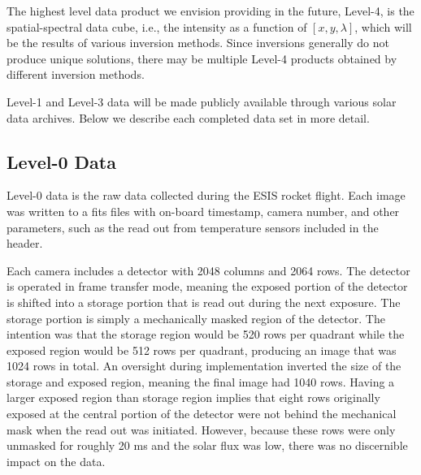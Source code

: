     The highest level data product we envision providing in the future, Level-4, is the spatial-spectral data cube, i.e., the intensity as a function of $[x, y , \lambda]$, which will be the results of various inversion methods.    
    Since inversions generally do not produce unique solutions, there may be multiple Level-4 products obtained by different inversion methods.  
    
    Level-1 and Level-3 data will be made publicly available through various solar data archives. Below we describe each completed data set in more detail. 
    
    \subsection{Level-0 Data}
    
        Level-0 data is the raw data collected during the ESIS rocket flight.  
	    Each image was written to a fits files with on-board timestamp, camera number, and other parameters, such as the read out from temperature sensors included in the header.   
	    
	    Each camera includes a detector with 2048 columns and 2064 rows.  The detector is operated in frame transfer mode, meaning the exposed portion of the detector is shifted into a storage portion that is read out during the next exposure. The storage portion is simply a mechanically masked region of the detector. The intention was that the storage region would be 520 rows per quadrant while the exposed region would be 512 rows per quadrant, producing an image that was 1024 rows in total.  An oversight during implementation inverted the size of the storage and exposed region, meaning the final image had 1040 rows.  Having a larger exposed region than storage region implies that eight rows originally exposed at the central portion of the detector were not behind the mechanical mask when the read out was initiated. However, because these rows were only unmasked for roughly 20 ms and the solar flux was low, there was no discernible impact on the data.
	    

